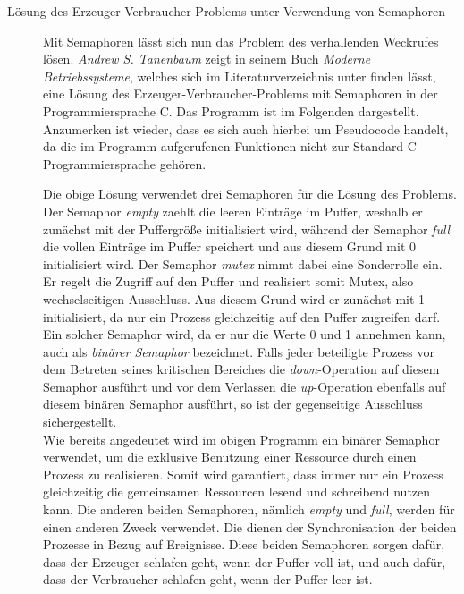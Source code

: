 \begin{description}
\begin{description}
							\item[Lösung des Erzeuger-Verbraucher-Problems unter Verwendung von Semaphoren]
							
								Mit Semaphoren lässt sich nun das Problem des verhallenden Weckrufes lösen. \textit{Andrew S. Tanenbaum} zeigt in seinem Buch \textit{Moderne Betriebssysteme}, welches sich im Literaturverzeichnis unter \cite{ModerneBetriebssysteme} finden lässt, eine Lösung des Erzeuger-Verbraucher-Problems mit Semaphoren in der Programmiersprache C. Das Programm ist im Folgenden dargestellt. Anzumerken ist wieder, dass es sich auch hierbei um Pseudocode handelt, da die im Programm aufgerufenen Funktionen nicht zur Standard-C-Programmiersprache gehören.
								
								
								
								Die obige Lösung verwendet drei Semaphoren für die Lösung des Problems. Der Semaphor \textit{empty} zaehlt die leeren Einträge im Puffer, weshalb er zunächst mit der Puffergröße initialisiert wird, während der Semaphor \textit{full} die vollen Einträge im Puffer speichert und aus diesem Grund mit 0 initialisiert wird. Der Semaphor \textit{mutex} nimmt dabei eine Sonderrolle ein. Er regelt die Zugriff auf den Puffer und realisiert somit Mutex, also wechselseitigen Ausschluss. Aus diesem Grund wird er zunächst mit 1 initialisiert, da nur ein Prozess gleichzeitig auf den Puffer zugreifen darf. Ein solcher Semaphor wird, da er nur die Werte 0 und 1 annehmen kann, auch als \textit{binärer Semaphor} bezeichnet. Falls jeder beteiligte Prozess vor dem Betreten seines kritischen Bereiches die \textit{down}-Operation auf diesem Semaphor ausführt und vor dem Verlassen die \textit{up}-Operation ebenfalls auf diesem binären Semaphor ausführt, so ist der gegenseitige Ausschluss sichergestellt.\\
								Wie bereits angedeutet wird im obigen Programm ein binärer Semaphor verwendet, um die exklusive Benutzung einer Ressource durch einen Prozess zu realisieren. Somit wird garantiert, dass immer nur ein Prozess gleichzeitig die gemeinsamen Ressourcen lesend und schreibend nutzen kann. Die anderen beiden Semaphoren, nämlich \textit{empty} und \textit{full}, werden für einen anderen Zweck verwendet. Die dienen der Synchronisation der beiden Prozesse in Bezug auf Ereignisse. Diese beiden Semaphoren sorgen dafür, dass der Erzeuger schlafen geht, wenn der Puffer voll ist, und auch dafür, dass der Verbraucher schlafen geht, wenn der Puffer leer ist. \cite{ModerneBetriebssysteme}
						\end{description}
					

\end{description}
